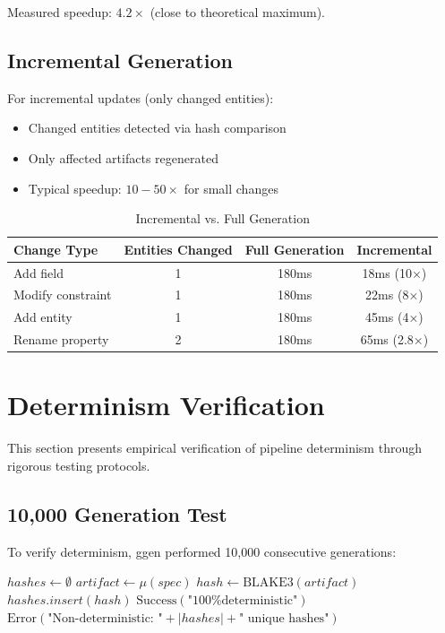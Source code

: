 Measured speedup: \(4.2\times\) (close to theoretical maximum).

\subsection{Incremental Generation}

For incremental updates (only changed entities):
\begin{itemize}
    \item Changed entities detected via hash comparison
    \item Only affected artifacts regenerated
    \item Typical speedup: \(10-50\times\) for small changes
\end{itemize}

\begin{table}[h]
\centering
\caption{Incremental vs. Full Generation}
\begin{tabular}{lccc}
\toprule
\textbf{Change Type} & \textbf{Entities Changed} & \textbf{Full Generation} & \textbf{Incremental} \\
\midrule
Add field & 1 & 180ms & 18ms (10×) \\
Modify constraint & 1 & 180ms & 22ms (8×) \\
Add entity & 1 & 180ms & 45ms (4×) \\
Rename property & 2 & 180ms & 65ms (2.8×) \\
\bottomrule
\end{tabular}
\end{table}

\section{Determinism Verification}

This section presents empirical verification of pipeline determinism through rigorous testing protocols.

\subsection{10,000 Generation Test}

To verify determinism, ggen performed 10,000 consecutive generations:

\begin{algorithm}
\caption{Determinism Verification}
\begin{algorithmic}[1]
    \State $hashes \gets \emptyset$
        \State $artifact \gets \mu(spec)$
        \State $hash \gets \text{BLAKE3}(artifact)$
        \State $hashes.insert(hash)$
    \EndFor
        \State \Return $\text{Success}(\text{"100\% deterministic"})$
    \Else
        \State \Return $\text{Error}(\text{"Non-deterministic: "} + |hashes| + \text{" unique hashes"})$
    \EndIf
\EndProcedure
\end{algorithmic}
\end{algorithm}

